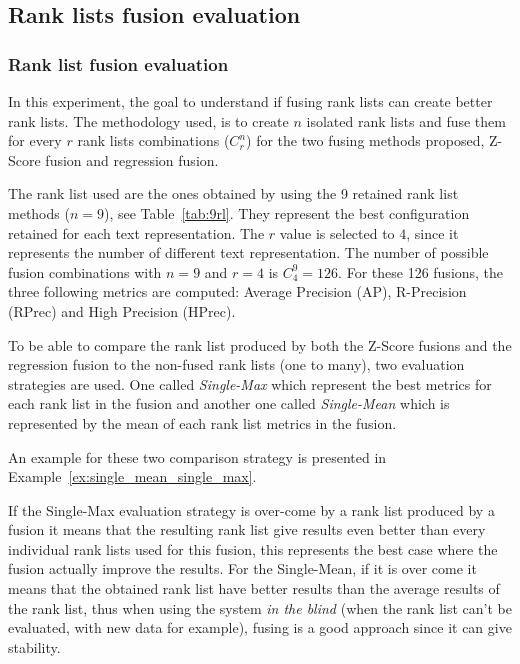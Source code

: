 \subsection{Rank lists fusion evaluation}

\subsubsection{Rank list fusion evaluation \label{sec:eval_fusion}}

In this experiment, the goal to understand if fusing rank lists can create better rank lists.
The methodology used, is to create $n$ isolated rank lists and fuse them for every $r$ rank lists combinations ($C^n_r$) for the two fusing methods proposed, Z-Score fusion and regression fusion.

The rank list used are the ones obtained by using the 9 retained rank list methods ($n=9$), see Table~\ref{tab:9rl}.
They represent the best configuration retained for each text representation.
The $r$ value is selected to $4$, since it represents the number of different text representation.
The number of possible fusion combinations with $n=9$ and $r=4$ is $C^{9}_{4} = 126$.
For these 126 fusions, the three following metrics are computed: Average Precision (AP), R-Precision (RPrec) and High Precision (HPrec).

To be able to compare the rank list produced by both the Z-Score fusions and the regression fusion to the non-fused rank lists (one to many), two evaluation strategies are used.
One called \textit{Single-Max} which represent the best metrics for each rank list in the fusion and another one called \textit{Single-Mean} which is represented by the mean of each rank list metrics in the fusion.

An example for these two comparison strategy is presented in Example~\ref{ex:single_mean_single_max}.

If the Single-Max evaluation strategy is over-come by a rank list produced by a fusion it means that the resulting rank list give results even better than every individual rank lists used for this fusion, this represents the best case where the fusion actually improve the results.
For the Single-Mean, if it is over come it means that the obtained rank list have better results than the average results of the rank list, thus when using the system \textit{in the blind} (when the rank list can't be evaluated, with new data for example), fusing is a good approach since it can give stability.

